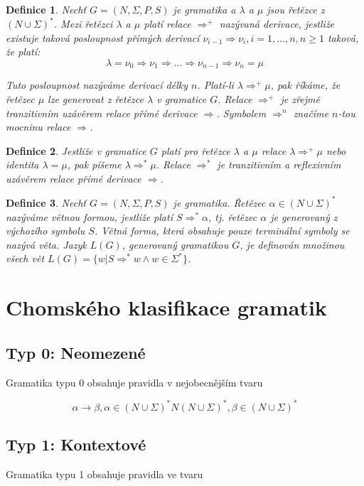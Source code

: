 \documentclass[a4paper, 11pt]{report}
\newtheorem{mydef}{Definice}[chapter]
\begin{document}
\begin{mydef}
Nechť $G = (N, \Sigma, P, S)$ je gramatika a $\lambda$ a $\mu$ jsou řetězce z $(N \cup \Sigma)^*$. Mezi řetězci $\lambda$ a $\mu$ platí relace $\Rightarrow^+$ nazývaná \emph{derivace}, jestliže existuje taková posloupnost přímých derivací $\nu_{i-1} \Rightarrow \nu_i, i = 1, \dots, n, n \geq 1$ taková, že platí:
$$\lambda = \nu_0 \Rightarrow \nu_1 \Rightarrow \dots \Rightarrow \nu_{n-1} \Rightarrow \nu_n = \mu$$

Tuto posloupnost nazýváme \emph{derivací délky $n$}. Platí-li $\lambda \Rightarrow^+ \mu$, pak říkáme, že řetězec $\mu$ lze generovat z řetězce $\lambda$ v gramatice $G$. Relace $\Rightarrow^+$ je zřejmě tranzitivním uzávěrem relace přímé derivace $\Rightarrow$. Symbolem $\Rightarrow^n$ značíme $n$-tou mocninu relace $\Rightarrow$.
\end{mydef}

\begin{mydef}
Jestliže v gramatice $G$ platí pro řetězce $\lambda$ a $\mu$ relace $\lambda \Rightarrow^+ \mu$ nebo identita $\lambda = \mu$, pak píšeme $\lambda \Rightarrow^* \mu$. Relace $\Rightarrow^*$ je tranzitivním a reflexivním uzávěrem relace přímé derivace $\Rightarrow$.
\end{mydef}

\begin{mydef}
Nechť $G=(N, \Sigma, P, S)$ je gramatika. Řetězec $\alpha \in (N \cup \Sigma)^*$ nazýváme \emph{větnou formou}, jestliže platí $S \Rightarrow^* \alpha$, tj. řetězec $\alpha$ je generovaný z výchozího symbolu $S$.
Větná forma, která obsahuje pouze terminální symboly se nazývá \emph{věta}. Jazyk $L(G)$, generovaný gramatikou $G$, je definován množinou všech vět $L(G) = \{ w | S \Rightarrow^* w \land w \in \Sigma^*\}$.
\end{mydef}

\section{Chomského klasifikace gramatik}
\subsection{Typ 0: Neomezené}
Gramatika typu 0 obsahuje pravidla v nejobecnějším tvaru

$$\alpha \to \beta, \alpha \in (N \cup \Sigma)^* N (N \cup \Sigma)^*, \beta \in (N \cup \Sigma)^*$$

\subsection{Typ 1: Kontextové}
Gramatika typu 1 obsahuje pravidla ve tvaru
\end{document}
